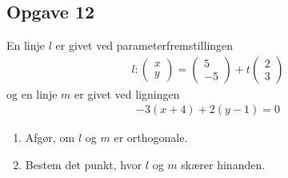 \subsection*{Opgave 12}
En linje $l$ er givet ved parameterfremstillingen
\begin{align*}
	l: \begin{pmatrix}
		x \\ y
	\end{pmatrix}
	=
	\begin{pmatrix}
		5 \\ -5
	\end{pmatrix} +
	t
	\begin{pmatrix}
		2 \\ 3
	\end{pmatrix}
\end{align*}
og en linje $m$ er givet ved ligningen
\begin{align*}
	-3(x+4) + 2(y-1) = 0
\end{align*}
\begin{enumerate}[label=\roman*)]
	\item Afgør, om $l$ og $m$ er orthogonale. 
	\item Bestem det punkt, hvor $l$ og $m$ skærer hinanden. 
\end{enumerate}
